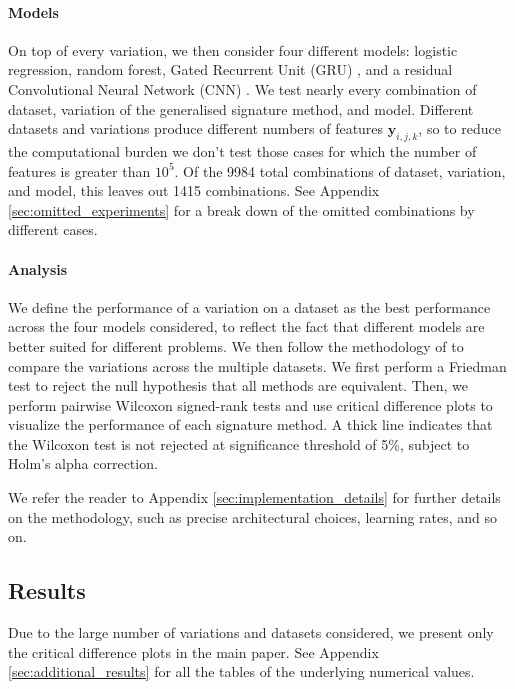 \documentclass{article}
\theoremstyle{definition}
\theoremstyle{remark}
\begin{document}
	\paragraph{Models} On top of every variation, we then consider four different models: logistic regression, random forest, Gated Recurrent Unit (GRU) \citep{gru}, and a residual Convolutional Neural Network (CNN) \citep{resnet}. We test nearly every combination of dataset, variation of the generalised signature method, and model. Different datasets and variations produce different numbers of features $\mathbf{y}_{i, j, k}$, so to reduce the computational burden we don't test those cases for which the number of features is greater than $10^5$. Of the 9984 total combinations of dataset, variation, and model, this leaves out 1415 combinations. See Appendix \ref{sec:omitted_experiments} for a break down of the omitted combinations by different cases.
	
	\paragraph{Analysis} We define the performance of a variation on a dataset as the best performance across the four models considered, to reflect the fact that different models are better suited for different problems. We then follow the methodology of \citet{demvsar2006statistical, benavoli2016should, IsmailFawaz2018deep} to compare the variations across the multiple datasets. We first perform a Friedman test to reject the null hypothesis that all methods are equivalent. Then, we perform pairwise Wilcoxon signed-rank tests and use critical difference plots to visualize the performance of each signature method. A thick line indicates that the Wilcoxon test is not rejected at significance threshold of 5\%, subject to Holm's alpha correction.

	We refer the reader to Appendix \ref{sec:implementation_details} for further details on the methodology, such as precise architectural choices, learning rates, and so on.

	\subsection{Results}
	
	Due to the large number of variations and datasets considered, we present only the critical difference plots in the main paper. See Appendix \ref{sec:additional_results} for all the tables of the underlying numerical values.
	
\end{document}
